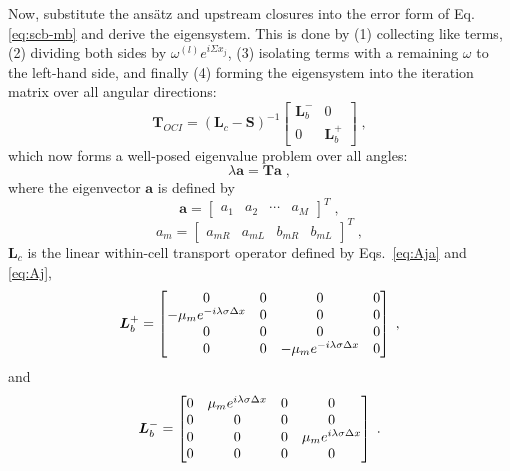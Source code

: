 Now, substitute the ansätz and upstream closures into the error form of Eq. \eqref{eq:scb-mb} and derive the eigensystem.
This is done by (1) collecting like terms, (2) dividing both sides by $\omega^{(l)} e^{i\Sigma x_j}$, (3) isolating terms with a remaining $\omega$ to the left-hand side, and finally (4) forming the eigensystem into the iteration matrix over all angular directions:
\begin{equation}
    \bm{T}_{OCI} = \left( 
    \bm{L}_c
    - \bm{S}
    \right)^{-1}
    \begin{bmatrix}
        \bm{L}_b^- & 0\\
        0 & \bm{L}_b^+
    \end{bmatrix} \;,
\end{equation}
which now forms a well-posed eigenvalue problem over all angles:
\begin{equation}
    \lambda\bm{a} = \bm{T} \bm{a} \; ,
\end{equation}
where the eigenvector $\mathbf{a}$ is defined by
\begin{equation}
    \mathbf{a} = \begin{bmatrix}
        a_{1} & a_{2} & \cdots & a_M
    \end{bmatrix} ^T \;,
\end{equation}
\begin{equation}
    a_m = \begin{bmatrix}
        a_{mR} & a_{mL} & b_{mR} & b_{mL} 
    \end{bmatrix} ^T \; ,
\end{equation}
$\bm{L}_c$ is the linear within-cell transport operator defined by Eqs.~\eqref{eq:Aja} and \eqref{eq:Aj}, 
\begin{equation}
    \bm{L}_b^+ = 
    \begin{bmatrix}
        0 & 0 & 0 & 0 \\
        -\mu_m e^{-i\lambda\sigma\Delta x} & 0 & 0 & 0 \\
        0 & 0 & 0 & 0 \\
        0 & 0 & -\mu_m e^{-i\lambda\sigma\Delta x} & 0
    \end{bmatrix} \; ,
\end{equation}
and
\begin{equation}
    \bm{L}_b^- = 
    \begin{bmatrix}
        0 & \mu_m e^{i\lambda\sigma\Delta x} & 0 & 0 \\
        0 & 0 & 0 & 0 \\
        0 & 0 & 0 & \mu_m e^{i\lambda\sigma\Delta x} \\
        0 & 0 & 0 & 0
    \end{bmatrix} \; .
\end{equation}
